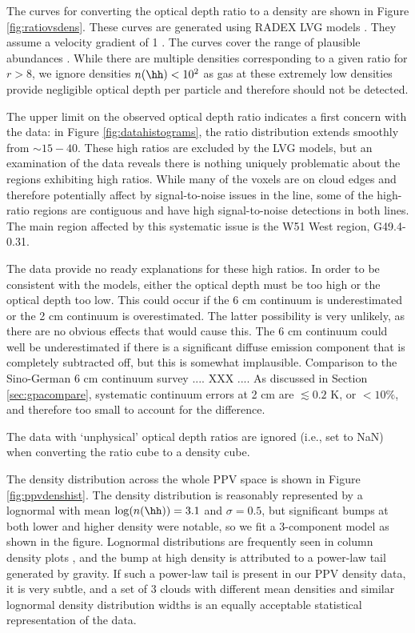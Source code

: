 The curves for converting the optical depth ratio to a density are shown in
Figure \ref{fig:ratiovsdens}.  These curves are generated using RADEX LVG models
\citep[python wrapper \url{https://github.com/keflavich/pyradex/}; original
code][]{van-Der-Tak2007a}.  They assume a velocity gradient of 1 \kms \perpc.
The curves cover the range of plausible \formaldehyde abundances
\citep{Mangum1993a}.  While there are multiple densities corresponding to a
given ratio for $r>8$, we ignore densities $n(\hh)<10^2$ \percc as gas at these
extremely low densities provide negligible optical depth per particle and
therefore should not be detected.

The upper limit on the observed optical depth ratio indicates a first concern
with the data: in Figure \ref{fig:datahistograms}, the ratio distribution
extends smoothly from $\sim15-40$.  These high ratios are excluded by the LVG
models, but an examination of the data reveals there is nothing uniquely
problematic about the regions exhibiting high ratios.  While many of the voxels
are on cloud edges and therefore potentially affect by signal-to-noise issues
in the \twotwo line, some of the high-ratio regions are contiguous and have
high signal-to-noise detections in both lines.  The main region affected by
this systematic issue is the W51 West region, G49.4-0.31.

The data provide no ready explanations for these high ratios.  In order to
be consistent with the models, either the \oneone optical depth must be
too high or the \twotwo optical depth too low.  This could occur if the
6 cm continuum is underestimated or the 2 cm continuum is overestimated.
The latter possibility is very unlikely, as there are no obvious effects that
would cause this.  The 6 cm continuum could well be underestimated if there
is a significant diffuse emission component that is completely subtracted off,
but this is somewhat implausible.  Comparison to the Sino-German 6 cm continuum
survey \citep{Sun2011b} .... XXX ....
As discussed in Section \ref{sec:gpacompare}, systematic continuum errors at 2
cm are $\lesssim 0.2$ K, or $<10\%$, and therefore too small to account for the
difference.

The data with `unphysical' optical depth ratios are ignored (i.e., set to NaN)
when converting the ratio cube to a density cube.

The density distribution across the whole PPV space is shown in Figure
\ref{fig:ppvdenshist}.  The density distribution
is reasonably represented by a lognormal with mean $\log(n(\hh))=3.1$ and
$\sigma=0.5$, but significant bumps at both lower and higher density were
notable, so we fit a 3-component model as shown in the figure.
Lognormal distributions are frequently seen in column density plots
\citep[e.g.]{Kainulainen2011a,Schneider2013a}, and the bump at high density is
attributed to a power-law tail generated by gravity.  If such a power-law tail
is present in our PPV density data, it is very subtle, and a set of 3 clouds
with different mean densities and similar lognormal density distribution widths
is an equally acceptable statistical representation of the data.

